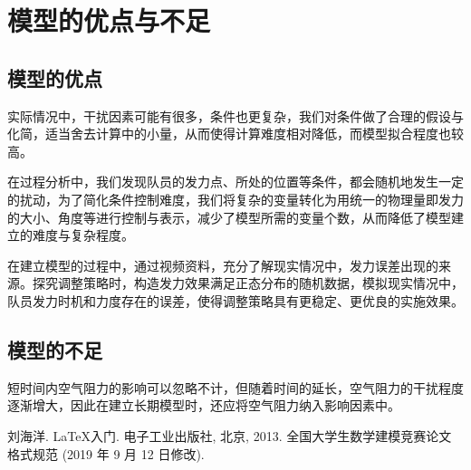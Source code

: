 \documentclass{cumcmthesis}
\begin{document}
\section{模型的优点与不足}
\subsection{模型的优点}
实际情况中，干扰因素可能有很多，条件也更复杂，我们对条件做了合理的假设与化简，适当舍去计算中的小量，从而使得计算难度相对降低，而模型拟合程度也较高。

在过程分析中，我们发现队员的发力点、所处的位置等条件，都会随机地发生一定的扰动，为了简化条件控制难度，我们将复杂的变量转化为用统一的物理量即发力的大小、角度等进行控制与表示，减少了模型所需的变量个数，从而降低了模型建立的难度与复杂程度。

在建立模型的过程中，通过视频资料，充分了解现实情况中，发力误差出现的来源。探究调整策略时，构造发力效果满足正态分布的随机数据，模拟现实情况中，队员发力时机和力度存在的误差，使得调整策略具有更稳定、更优良的实施效果。
\subsection{模型的不足}
短时间内空气阻力的影响可以忽略不计，但随着时间的延长，空气阻力的干扰程度逐渐增大，因此在建立长期模型时，还应将空气阻力纳入影响因素中。
\newpage

\begin{thebibliography}{9}%
    刘海洋.
    \newblock \LaTeX {}入门\allowbreak[J].
    \newblock 电子工业出版社, 北京, 2013.
    全国大学生数学建模竞赛论文格式规范 (2019 年 9 月 12 日修改).
\end{thebibliography}
\end{document}
